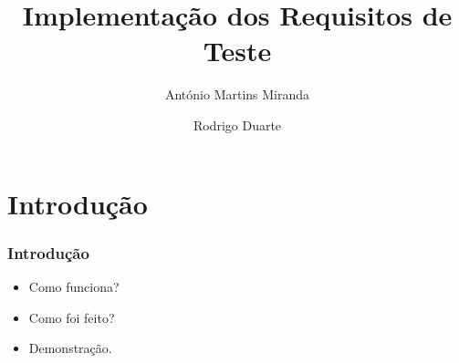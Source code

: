 \documentclass{beamer}
\title{
       \textbf{Implementação dos Requisitos de Teste}
      }
\author[António Martins Miranda, Rodrigo Duarte]
{António Martins Miranda \and Rodrigo Duarte}
\begin{document}
\maketitle	

\section{Introdução}

\begin{frame}
  \frametitle{Introdução}
  \begin{itemize}
    \item Como funciona? 
    \item Como foi feito?
    \item Demonstração.
  \end{itemize}
\end{frame}
\end{document}
